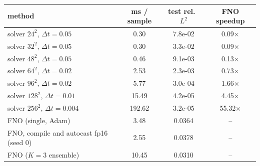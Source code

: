 \begin{tabular}{lccc}
\toprule
method & ms / sample & test rel.\ $L^2$ & FNO speedup \\
\midrule
solver $24^2$, $\Delta t=0.05$ & 0.30 & 7.8e-02 & 0.09$\times$ \\
solver $32^2$, $\Delta t=0.05$ & 0.30 & 3.3e-02 & 0.09$\times$ \\
solver $48^2$, $\Delta t=0.05$ & 0.46 & 9.1e-03 & 0.13$\times$ \\
solver $64^2$, $\Delta t=0.02$ & 2.53 & 2.3e-03 & 0.73$\times$ \\
solver $96^2$, $\Delta t=0.02$ & 5.77 & 3.0e-04 & 1.66$\times$ \\
solver $128^2$, $\Delta t=0.01$ & 15.49 & 4.2e-05 & 4.45$\times$ \\
solver $256^2$, $\Delta t=0.004$ & 192.62 & 3.2e-05 & 55.32$\times$ \\
FNO (single, Adam) & 3.48 & 0.0364 & -- \\
FNO, compile and autocast fp16 (seed 0) & 2.55 & 0.0378 & -- \\
FNO ($K{=}3$ ensemble) & 10.45 & 0.0310 & -- \\
\bottomrule
\end{tabular}